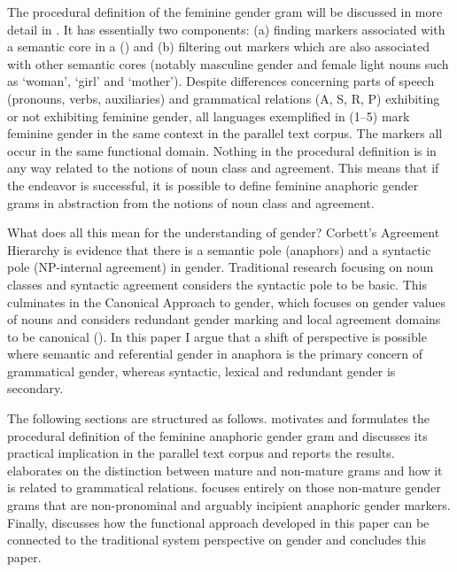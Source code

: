 \documentclass[output=collectionpaper]{langsci/langscibook}
\begin{document}
The procedural definition of the feminine gender gram will be discussed in more detail in . It has essentially two components: (a) finding markers associated with a semantic core in a  (\citealt{Givon1981}) and (b) filtering out markers which are also associated with other semantic cores (notably masculine gender and female light nouns such as ‘woman’, ‘girl’ and ‘mother’). Despite differences concerning parts of speech (pronouns, verbs, auxiliaries) and grammatical relations (A, S, R, P) exhibiting or not exhibiting feminine gender, all languages exemplified in (1--5) mark feminine gender in the same context in the parallel text corpus. The markers all occur in the same functional domain. Nothing in the procedural definition is in any way related to the notions of noun class and agreement. This means that if the endeavor is successful, it is possible to define feminine anaphoric gender grams in abstraction from the notions of noun class and agreement.

What does all this mean for the understanding of gender? Corbett’s Agreement Hierarchy is evidence that there is a semantic pole (anaphors) and a syntactic pole (NP-internal agreement) in gender. Traditional research focusing on noun classes and syntactic agreement considers the syntactic pole to be basic. This culminates in the Canonical Approach to gender, which focuses on gender values of nouns and considers redundant gender marking and local agreement domains to be canonical (\citealt{Corbett2016}). In this paper I argue that a shift of perspective is possible where semantic and referential gender in anaphora is the primary concern of grammatical gender, whereas syntactic, lexical and redundant gender is secondary.

The following sections are structured as follows.  motivates and formulates the procedural definition of the feminine anaphoric gender gram and  discusses its practical implication in the parallel text corpus and reports the results.  elaborates on the distinction between mature and non-mature grams and how it is related to grammatical relations.  focuses entirely on those non-mature gender grams that are non-pronominal and arguably incipient anaphoric gender markers. Finally,  discusses how the functional approach developed in this paper can be connected to the traditional system perspective on gender and  concludes this paper.
\end{document}
